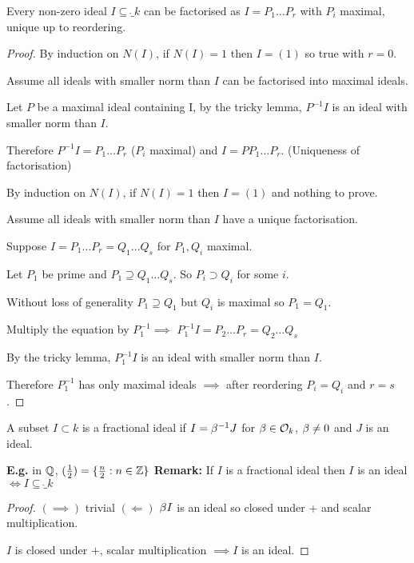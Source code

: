 \documentclass[11pt]{article}
\begin{document}
	    
    \begin{theorem}
Every non-zero ideal $I \subseteq \ring_k$ can be factorised as $I = P_1 \dots P_r$ with $P_i$ maximal, unique up to reordering.
    \end{theorem}
    
    
    
    \begin{proof}
	    By induction on $N(I)$, if $N(I) = 1 $ then $I=(1) $ so true with $r = 0$.

	    Assume all ideals with smaller norm than $I$ can be factorised into maximal ideals.

	    Let $P$ be a maximal ideal containing I, by the tricky lemma, $P^{-1} I$ is an ideal with smaller norm than $I$.
	    
	    Therefore $P^{-1} I = P_1 \dots P_r$ ($P_i$ maximal) and $I = P P_1 \dots P_r$.
\spac
	    (Uniqueness of factorisation)

	    By induction on $N(I)$, if $N(I)=1$ then $I= (1)$ and nothing to prove.
	    
	    Assume all ideals with smaller norm than $I$ have a unique factorisation.

	    Suppose $I = P_1 \dots P_r = Q_1 \dots Q_s$ for $P_1, Q_i$ maximal.
\spa

Let $P_1$ be prime and $P_1 \supseteq Q_1 \dots Q_s $. So $P_i \supset Q_i$ for some $i$.
\spa

Without loss of generality $P_1 \supseteq Q_1$ but $Q_i$ is maximal so $P_1 = Q_1$.
\spa

	    Multiply the equation by $P_1^{-1} \implies $ $P_1^{-1}I = P_2 \dots P_r = Q_2 \dots Q_s$ 
\spa

By the tricky lemma, $P_1^{-1} I$ is an ideal with smaller norm than $I$. 
\spa

	    Therefore $P_1^{-1}$ has only maximal ideals $\implies$ after reordering $P_i = Q_i$ and $r=s$.
    \end{proof}
\spa
A subset $I \subset k$ is a fractional ideal if $I = \beta^{-1} J $ for $\beta \in \mathcal{O}_k$, $\beta \neq 0$ and $J$ is an ideal.

\spa
\textbf{E.g.} in $\mathbb{Q}$, $(\frac{1}{2} ) = \{\frac{n}{2}: n \in \mathbb{Z} \}$
\spac
\textbf{Remark:} If $I$ is a fractional ideal then $I$ is an ideal $\iff I \subseteq \ring_k$
\begin{proof}
	$(\implies)$ trivial
	\spac
	$(\Longleftarrow)$ $\beta I$ is an ideal so closed under $+$ and scalar multiplication.

	$I$ is closed under $+$, scalar multiplication $\implies I$ is an ideal.
\end{proof}
\end{document}
